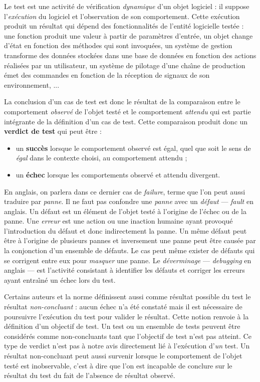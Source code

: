 Le test est une activit\'e de v\'erification \emph{dynamique} d'un
objet logiciel : il suppose l'\emph{ex\'ecution} du logiciel et
l'observation de son comportement. Cette ex\'ecution produit un r\'esultat qui
d\'epend des fonctionnalit\'es de l'entit\'e logicielle test\'ee :
une fonction produit une valeur \`a partir de param\`etres
d'entr\'ee, un objet change d'\'etat en fonction des m\'ethodes qui
sont invoqu\'ees, un syst\`eme de gestion  transforme des
donn\'ees stock\'ees dans une base de donn\'ees en fonction des
actions r\'ealis\'ees par un utilisateur, un syst\`eme de
pilotage d'une cha\^{\i}ne de production \'emet des commandes en
fonction de la r\'eception de signaux de son environnement, ...

La conclusion d'un cas de test est donc le r\'esultat de la comparaison
entre le comportement \emph{observ\'e} de l'objet test\'e et le
comportement \emph{attendu} qui est partie int\'egrante de la
d\'efinition d'un cas de test. Cette comparaison produit donc un
\textbf{verdict de test} qui peut \^etre :
\begin{itemize}
  \item un \textbf{succ\`es} lorsque le comportement observ\'e est
    \'egal, quel que soit le sens de \emph{\'egal} dans le contexte choisi,
    au comportement attendu ;
  \item un \textbf{\'echec} lorsque les comportements observ\'e et
    attendu divergent. 
\end{itemize}
En anglais, on parlera dans ce dernier cas de \emph{failure}, terme
que l'on peut aussi traduire par \emph{panne}. Il ne faut pas
confondre une \emph{panne} avec un \emph{d\'efaut} --- \emph{fault}
en anglais. Un d\'efaut est un \'el\'ement de l'objet test\'e \`a l'origine de l'\'echec ou
de la panne. Une \emph{erreur} est une action ou une inaction
humaine ayant provoqu\'e l'introduction du d\'efaut et donc
indirectement la panne. Un m\^eme d\'efaut peut \^etre \`a l'origine de
plusieurs pannes  et inversement une panne peut \^etre caus\'ee par
la conjonction d'un ensemble de d\'efauts. Le cas peut m\^eme
exister de d\'efauts qui se corrigent entre eux pour \emph{masquer} une panne.
Le \emph{d\'everminage} --- \emph{debugging} en anglais  --- est
l'activit\'e consistant \`a identifier les d\'efauts et corriger
les erreurs ayant entra\^{\i}n\'e un \'echec lors du test.

Certains auteurs et la norme \cite{itu-z500} d\'efinissent aussi comme r\'esultat possible du
test le r\'esultat \emph{non-concluant} : aucun \'echec n'a
\'et\'e constat\'e mais il est n\'ecessaire de poursuivre
l'ex\'ecution du test pour valider le r\'esultat. Cette notion
renvoie \`a la d\'efinition d'un objectif de test. Un test ou un
ensemble de tests peuvent \^etre consid\'er\'es comme
non-concluants tant que l'objectif de test n'est pas atteint. Ce type
de verdict  n'est
pas \`a notre avis directement li\'e \`a l'ex\'ecution
d'\emph{un} test. 
Un r\'esultat non-concluant peut aussi survenir
lorsque le comportement de l'objet test\'e est inobservable, c'est
\`a dire que l'on est incapable de conclure sur le r\'esultat du
test du fait de l'absence de r\'esultat observ\'e.

